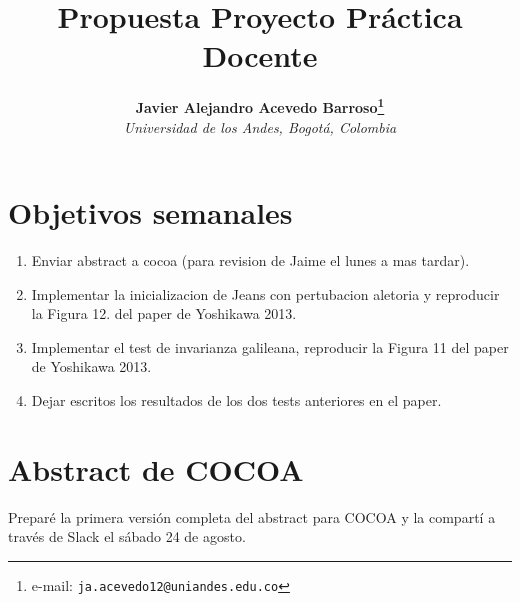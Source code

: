 \documentclass[notitlepage,letterpaper,12pt]{article} %
\begin{document}
\title{Propuesta Proyecto Práctica Docente}
\author{
\textbf{Javier Alejandro Acevedo Barroso\thanks{e-mail: \texttt{ja.acevedo12@uniandes.edu.co}}}\\
\textit{Universidad de los Andes, Bogotá, Colombia}\\
} %

\maketitle %






 

\section{Objetivos semanales}
\begin{enumerate}
\item Enviar abstract a cocoa (para revision de Jaime el lunes a mas tardar). 
\item Implementar la inicializacion de Jeans con pertubacion aletoria y reproducir la Figura 12. del paper de Yoshikawa 2013.
\item Implementar el test de invarianza galileana, reproducir la Figura 11 del paper de Yoshikawa 2013.
\item Dejar escritos los resultados de los dos tests anteriores en el paper.
\end{enumerate}

\section{Abstract de COCOA}
Preparé la primera versión completa del abstract para COCOA y la compartí a través de Slack el sábado 24 de agosto.
\end{document}
